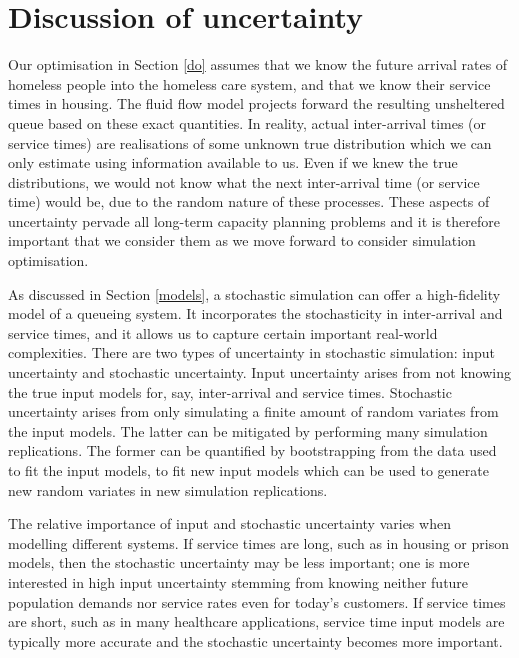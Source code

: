 \documentclass[12pt,a4paper]{article}
\begin{document}
\newpage

\section{Discussion of uncertainty} \label{uncert}

Our optimisation in Section \ref{do} assumes that we know the future arrival rates of homeless people into the homeless care system, and that we know their service times in housing. The fluid flow model projects forward the resulting unsheltered queue based on these exact quantities. In reality, actual inter-arrival times (or service times) are realisations of some unknown true distribution which we can only estimate using information available to us. Even if we knew the true distributions, we would not know what the next inter-arrival time (or service time) would be, due to the random nature of these processes. These aspects of uncertainty pervade all long-term capacity planning problems and it is therefore important that we consider them as we move forward to consider simulation optimisation.

As discussed in Section \ref{models}, a stochastic simulation can offer a high-fidelity model of a queueing system. It incorporates the stochasticity in inter-arrival and service times, and it allows us to capture certain important real-world complexities. There are two types of uncertainty in stochastic simulation: input uncertainty and stochastic uncertainty. Input uncertainty arises from not knowing the true input models for, say, inter-arrival and service times. Stochastic uncertainty arises from only simulating a finite amount of random variates from the input models. The latter can be mitigated by performing many simulation replications. The former can be quantified by bootstrapping from the data used to fit the input models, to fit new input models which can be used to generate new random variates in new simulation replications.

The relative importance of input and stochastic uncertainty varies when modelling different systems. If service times are long, such as in housing or prison models, then the stochastic uncertainty may be less important; one is more interested in high input uncertainty stemming from knowing neither future population demands nor service rates even for today's customers. If service times are short, such as in many healthcare applications, service time input models are typically more accurate and the stochastic uncertainty becomes more important. 
\end{document}
